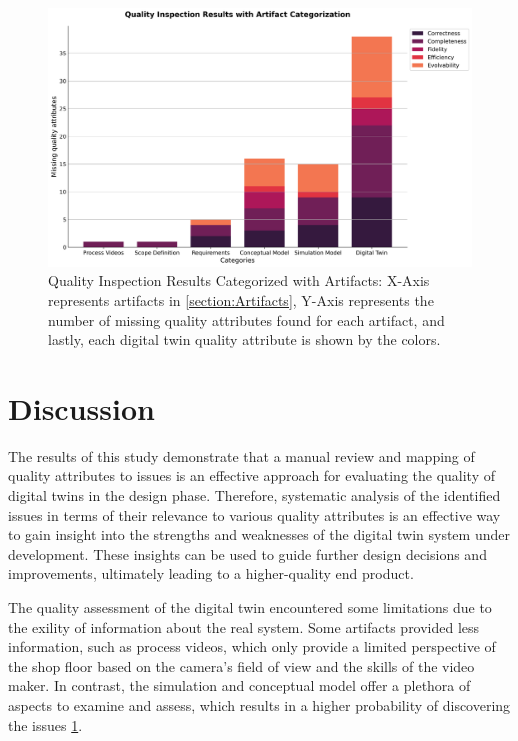 \documentclass{llncs}
\begin{document}
    \begin{figure}[htbp]
        \includegraphics[scale = 0.40]{quality_inspection_results_with_artifacts.png}
        \caption{Quality Inspection Results Categorized with Artifacts: X-Axis represents artifacts in \ref{section:Artifacts}, Y-Axis represents the number of missing quality attributes found for each artifact, 
        and lastly, each digital twin quality attribute is shown by the colors.}
        \label{fig:QualityInspectonResultsWithArtifacts}
    \end{figure}

    

    \section{Discussion}

    The results of this study demonstrate that a manual review and mapping of quality attributes to issues is an effective approach for evaluating the quality of digital twins in the design phase.  
    Therefore, systematic analysis of the identified issues in terms of their relevance to various quality attributes is an effective way to gain insight into the strengths and weaknesses of the digital twin system under development. 
    These insights can be used to guide further design decisions and improvements, ultimately leading to a higher-quality end product.

    The quality assessment of the digital twin encountered some limitations due to the exility of information about the real system. Some artifacts provided less information, 
    such as process videos, which only provide a limited perspective of the shop floor based on the camera's field of view and the skills of the video maker. 
    In contrast, the simulation and conceptual model offer a plethora of aspects to examine and assess, which results in a higher probability of discovering the issues \ref{fig:QualityInspectonResultsWithArtifacts}.
\end{document}
